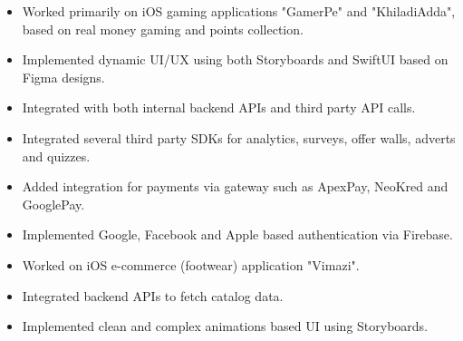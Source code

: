 \documentclass[10pt,a4paper,ragged2e]{maltacv}
\begin{document}


\makecvheader

\medskip
{}

\begin{itemize}
  \item Worked primarily on iOS gaming applications "GamerPe" and "KhiladiAdda", based on real money gaming and points collection. 
  \item Implemented dynamic UI/UX using both Storyboards and SwiftUI based on Figma designs. 
  \item Integrated with both internal backend APIs and third party API calls. 
  \item Integrated several third party SDKs for analytics, surveys, offer walls, adverts and quizzes. 
  \item Added integration for payments via gateway such as ApexPay, NeoKred and GooglePay. 
  \item Implemented Google, Facebook and Apple based authentication via Firebase.
\end{itemize}
\divider

\begin{itemize}
  \item Worked on iOS e-commerce (footwear) application "Vimazi".
  \item Integrated backend APIs to fetch catalog data.
  \item Implemented clean and complex animations based UI using Storyboards.
\end{itemize}
\divider
\end{document}
